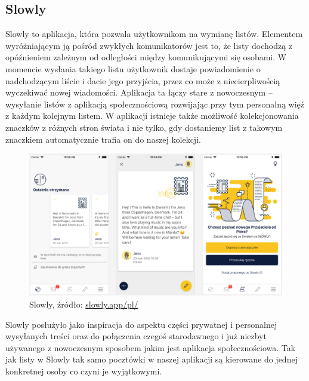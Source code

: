 \documentclass[a4paper,twoside,12pt]{book}
\begin{document}
\newpage
\subsection{Slowly}
Slowly to aplikacja, która pozwala użytkownikom na wymianę listów. Elementem wyróżniającym ją pośród zwykłych komunikatorów jest to, że listy dochodzą z opóźnieniem zależnym od odległości między komunikującymi się osobami. W momencie wysłania takiego listu użytkownik dostaje powiadomienie o nadchodzącym liście i dacie jego przyjścia, przez co może z niecierpliwością wyczekiwać nowej wiadomości. Aplikacja ta łączy stare z nowoczesnym -- wysyłanie listów z aplikacją społecznościową rozwijając przy tym personalną więź z każdym kolejnym listem. W aplikacji istnieje także możliwość kolekcjonowania znaczków z różnych stron świata i nie tylko, gdy dostaniemy list z takowym znaczkiem automatycznie trafia on do naszej kolekcji.
\begin{figure}[H]
    \centering
    \includegraphics[width=1\textwidth]{apki_ss/slowly.png}
    \captionsetup{justification=centering}
    \caption{Slowly, źródło: \href{https://slowly.app/pl/}{slowly.app/pl/}}
\end{figure}
Slowly posłużyło jako inspiracja do aspektu części prywatnej i personalnej wysyłanych treści oraz do połączenia czegoś starodawnego i już niezbyt używanego z nowoczesnym sposobem jakim jest aplikacja społecznościowa. Tak jak listy w Slowly tak samo pocztówki w naszej aplikacji są kierowane do jednej konkretnej osoby co czyni je wyjątkowymi.
\newpage
\end{document}
